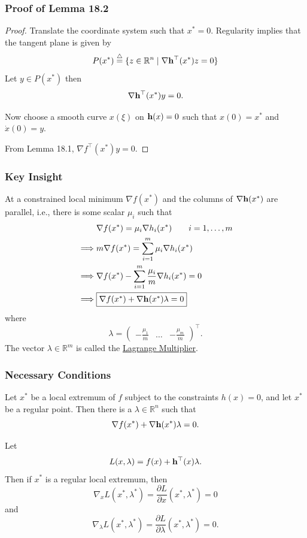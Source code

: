 \documentclass{beamer}
\begin{document}
\begin{frame}\frametitle{Proof of Lemma 18.2}
	\begin{proof}
		Translate the coordinate system such that $x^{\ast} = 0$.  Regularity implies that the tangent plane is given by 
		\[ 
			P(x^{\ast}) \stackrel{\triangle}{=} \{ z\in \mathbb{R}^n \mid \nabla \mathbf{h}^\top (x^{\ast})z = 0 \} 
		\]
		Let $y \in P(x^{\ast})$ then 
		\[
			\nabla \mathbf{h}^\top (x^{\ast}) y = 0.
		\]
		
		\vfill
		
		Now choose a smooth curve $x(\xi)$ on $\mathbf{h}(x) = 0$ such that $x(0) = x^{\ast}$ and $\dot{x}(0) = y$.
		
		\vfill
		
		From Lemma 18.1, $\nabla f^\top (x^{\ast})y = 0$. 
	\end{proof}
\end{frame}

\begin{frame}\frametitle{Key Insight}
	At a constrained local minimum $\nabla f(x^{\ast})$ and the columns of $\nabla \mathbf{h}(x^{\ast})$ are parallel, i.e., there is some scalar $\mu_i$ such that
	\begin{align*}
		& \nabla f(x^{\ast}) = \mu_i\nabla h_i(x^{\ast}) \qquad i= 1,\ldots,m \\
		\implies & m\nabla f(x^{\ast}) = \sum_{i=1}^m \mu_i \nabla h_i (x^{\ast}) \\
		\implies & \nabla f(x^{\ast}) - \sum_{i=1}^m \frac{\mu_i}{m}\nabla h_i(x^{\ast}) = 0\\
		\implies & \fbox{$\nabla f(x^{\ast}) + \nabla \mathbf{h}(x^{\ast}) \lambda = 0$}
	\end{align*}
	where 
	\[
		\lambda = \begin{pmatrix}
	    			-\frac{\mu_1}{m} &
	    			\dots &
	    			-\frac{\mu_m}{m}
	  			  \end{pmatrix}^\top.
	\]
	The vector $\lambda \in \mathbb{R}^m$ is called the \underline{Lagrange Multiplier}.	
\end{frame}

\begin{frame}\frametitle{Necessary Conditions}
	\begin{theorem}
		Let $x^{\ast}$ be a local extremum of $f$ subject to the constraints $h(x) = 0$, and let $x^{\ast}$ be a regular point.  Then there is a $\lambda \in \mathbb{R}^n$ such that
		\[ 
			\nabla f(x^{\ast}) + \nabla \mathbf{h}(x^{\ast})\lambda = 0.
		\]
	\end{theorem}	
	\begin{corollary}
		Let 
		\[ 
			L(x,\lambda) = f(x) + \mathbf{h}^\top(x)\lambda.
		\]
		Then if $x^{\ast}$ is a regular local extremum, then
		\[ 
			\nabla_x L(x^{\ast},\lambda^{\ast}) = \frac{\partial L}{\partial x}(x^{\ast},\lambda^{\ast}) = 0 
		\]
		and
		\[ 
			\nabla_{\lambda}L(x^{\ast},\lambda^{\ast}) = \frac{\partial L}{\partial \lambda}(x^{\ast},\lambda^{\ast}) = 0.
		\]
	\end{corollary}
\end{frame}
	
\end{document}
